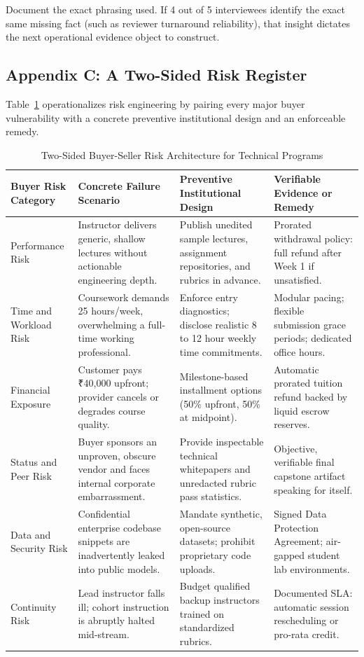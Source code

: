 Document the exact phrasing used. If 4 out of 5 interviewees identify the exact same missing fact (such as reviewer turnaround reliability), that insight dictates the next operational evidence object to construct.

\subsection*{Appendix C: A Two-Sided Risk Register}

Table~\ref{tab:risk_register} operationalizes risk engineering by pairing every major buyer vulnerability with a concrete preventive institutional design and an enforceable remedy.

\begin{table}[t]
\centering
\small
\caption{Two-Sided Buyer-Seller Risk Architecture for Technical Programs}
\label{tab:risk_register}
\begin{tabular}{p{2.5cm}p{4.2cm}p{4.8cm}p{4.3cm}}
\toprule
\textbf{Buyer Risk Category} & \textbf{Concrete Failure Scenario} & \textbf{Preventive Institutional Design} & \textbf{Verifiable Evidence or Remedy} \\
\midrule
Performance Risk & Instructor delivers generic, shallow lectures without actionable engineering depth. & Publish unedited sample lectures, assignment repositories, and rubrics in advance. & Prorated withdrawal policy: full refund after Week 1 if unsatisfied. \\
\addlinespace
Time and Workload Risk & Coursework demands 25 hours/week, overwhelming a full-time working professional. & Enforce entry diagnostics; disclose realistic 8 to 12 hour weekly time commitments. & Modular pacing; flexible submission grace periods; dedicated office hours. \\
\addlinespace
Financial Exposure & Customer pays ₹40,000 upfront; provider cancels or degrades course quality. & Milestone-based installment options (50\% upfront, 50\% at midpoint). & Automatic prorated tuition refund backed by liquid escrow reserves. \\
\addlinespace
Status and Peer Risk & Buyer sponsors an unproven, obscure vendor and faces internal corporate embarrassment. & Provide inspectable technical whitepapers and unredacted rubric pass statistics. & Objective, verifiable final capstone artifact speaking for itself. \\
\addlinespace
Data and Security Risk & Confidential enterprise codebase snippets are inadvertently leaked into public models. & Mandate synthetic, open-source datasets; prohibit proprietary code uploads. & Signed Data Protection Agreement; air-gapped student lab environments. \\
\addlinespace
Continuity Risk & Lead instructor falls ill; cohort instruction is abruptly halted mid-stream. & Budget qualified backup instructors trained on standardized rubrics. & Documented SLA: automatic session rescheduling or pro-rata credit. \\
\bottomrule
\end{tabular}
\end{table}

